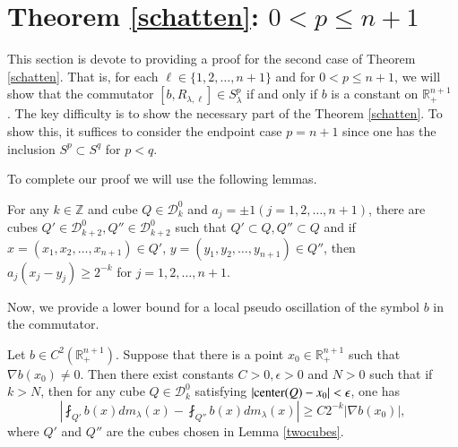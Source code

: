 \documentclass[12pt]{amsart}
\begin{document}
\section{Theorem \ref{schatten}: $0<p\leq n+1$}\label{four}

This section is devote to providing a proof for the second case of Theorem \ref{schatten}. That is, for each $\ell\in \{1,2,\ldots,n+1\}$ and for $0<p\leq n+1$, we will show that the commutator $[b,R_{\lambda,\ell}]\in S_\lambda^p$ if and only if $b$ is a constant  on $\mathbb{R}^{n+1}_+$ . The key difficulty is to show the necessary part of the Theorem \ref{schatten}. To show this, it suffices to consider the endpoint case $p=n+1$ since one has the inclusion $S^p \subset S^q$ for $p<q.$

To complete our proof we will use the following lemmas.

\begin{lemma}\label{twocubes}
For any $k\in\mathbb{Z}$ and cube $Q\in \mathcal{D}_{k}^0$ and $a_j=\pm 1(j=1,2,\ldots,n+1)$, there are cubes $Q' \in \mathcal{D}_{k+2}^0, Q'' \in \mathcal{D}_{k+2}^0$ such that $Q'\subset Q, Q'' \subset Q$ and if $x=(x_1,x_2,\ldots,x_{n+1})\in Q'$, $y= (y_1,y_2,\ldots,y_{n+1})\in Q''$, then $a_j(x_j-y_j)\geq 2^{-k}$ for $j=1,2,\ldots,n+1$.
\end{lemma}
Now, we provide a lower bound for a local pseudo oscillation of the symbol $b$ in the commutator.
\begin{lemma}\label{lowerboundcommu}
Let $b\in C^2(\mathbb{R}_+^{n+1})$. Suppose that there is a point $x_0\in \mathbb{R}_+^{n+1}$ such that $\nabla b(x_0) \neq 0$. Then there exist constants $C>0, \epsilon>0$ and  $N>0$ such that if $k>N$, then for any cube $Q \in \mathcal{D}_{k}^0$ satisfying $|{\rm center}(Q)- x_0|<\epsilon$, one has
\begin{equation}\label{contonb}
\left|\fint_{Q'}b(x)dm_\lambda(x) -\fint_{Q''}b(x)dm_\lambda(x)\right| \geq C2^{-k}|\nabla b(x_0)|,
\end{equation}
where $Q'$ and $Q''$ are the cubes chosen in Lemma \ref{twocubes}.

\end{lemma}
\end{document}
